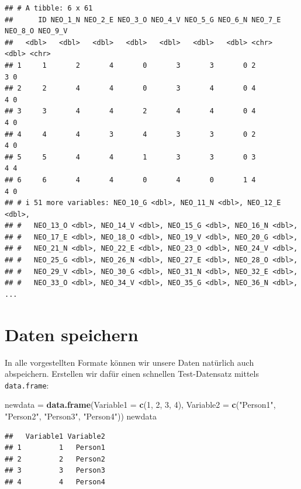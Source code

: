 \documentclass[
]{book}
\newenvironment{Shaded}{\begin{snugshade}}{\end{snugshade}}
\newcommand{\AttributeTok}[1]{\textcolor[rgb]{0.13,0.29,0.53}{#1}}
\newcommand{\DecValTok}[1]{\textcolor[rgb]{0.00,0.00,0.81}{#1}}
\newcommand{\FunctionTok}[1]{\textcolor[rgb]{0.13,0.29,0.53}{\textbf{#1}}}
\newcommand{\NormalTok}[1]{#1}
\newcommand{\OtherTok}[1]{\textcolor[rgb]{0.56,0.35,0.01}{#1}}
\newcommand{\StringTok}[1]{\textcolor[rgb]{0.31,0.60,0.02}{#1}}
\begin{document}
\begin{verbatim}
## # A tibble: 6 x 61
##      ID NEO_1_N NEO_2_E NEO_3_O NEO_4_V NEO_5_G NEO_6_N NEO_7_E NEO_8_O NEO_9_V
##   <dbl>   <dbl>   <dbl>   <dbl>   <dbl>   <dbl>   <dbl> <chr>     <dbl> <chr>  
## 1     1       2       4       0       3       3       0 2             3 0      
## 2     2       4       4       0       3       4       0 4             4 0      
## 3     3       4       4       2       4       4       0 4             4 0      
## 4     4       4       3       4       3       3       0 2             4 0      
## 5     5       4       4       1       3       3       0 3             4 4      
## 6     6       4       4       0       4       0       1 4             4 0      
## # i 51 more variables: NEO_10_G <dbl>, NEO_11_N <dbl>, NEO_12_E <dbl>,
## #   NEO_13_O <dbl>, NEO_14_V <dbl>, NEO_15_G <dbl>, NEO_16_N <dbl>,
## #   NEO_17_E <dbl>, NEO_18_O <dbl>, NEO_19_V <dbl>, NEO_20_G <dbl>,
## #   NEO_21_N <dbl>, NEO_22_E <dbl>, NEO_23_O <dbl>, NEO_24_V <dbl>,
## #   NEO_25_G <dbl>, NEO_26_N <dbl>, NEO_27_E <dbl>, NEO_28_O <dbl>,
## #   NEO_29_V <dbl>, NEO_30_G <dbl>, NEO_31_N <dbl>, NEO_32_E <dbl>,
## #   NEO_33_O <dbl>, NEO_34_V <dbl>, NEO_35_G <dbl>, NEO_36_N <dbl>, ...
\end{verbatim}

\section{Daten speichern}\label{daten-speichern}

In alle vorgestellten Formate können wir unsere Daten natürlich auch abspeichern. Erstellen wir dafür einen schnellen Test-Datensatz mittels \texttt{data.frame}:

\begin{Shaded}
\begin{Highlighting}[]
\NormalTok{newdata }\OtherTok{=} \FunctionTok{data.frame}\NormalTok{(}\AttributeTok{Variable1 =} \FunctionTok{c}\NormalTok{(}\DecValTok{1}\NormalTok{, }\DecValTok{2}\NormalTok{, }\DecValTok{3}\NormalTok{, }\DecValTok{4}\NormalTok{),}
                     \AttributeTok{Variable2 =} \FunctionTok{c}\NormalTok{(}\StringTok{"Person1"}\NormalTok{, }\StringTok{"Person2"}\NormalTok{, }\StringTok{"Person3"}\NormalTok{, }\StringTok{"Person4"}\NormalTok{))}
\NormalTok{newdata}
\end{Highlighting}
\end{Shaded}

\begin{verbatim}
##   Variable1 Variable2
## 1         1   Person1
## 2         2   Person2
## 3         3   Person3
## 4         4   Person4
\end{verbatim}
\end{document}
